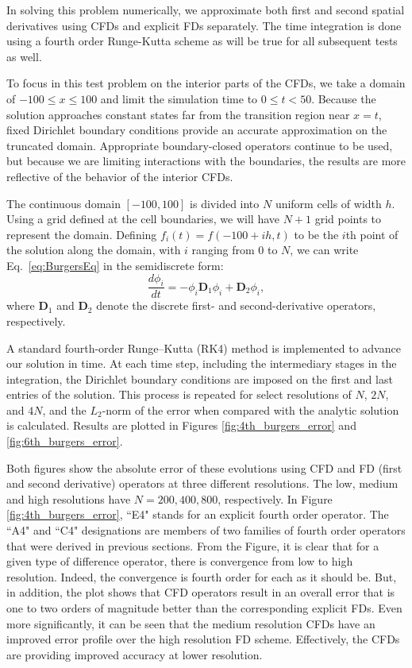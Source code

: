 In solving this problem numerically, we approximate both first and second spatial derivatives using CFDs and explicit FDs separately.  The time integration is done using a fourth order Runge-Kutta scheme as will be true for all subsequent tests as well.   

To focus in this test problem on the interior parts of the CFDs, we take a domain of $-100 \le x \le 100$ and limit the simulation time to $0 \le t < 50$. Because the solution approaches constant states far from the transition region near $x=t$, fixed Dirichlet boundary conditions provide an accurate approximation on the truncated domain.  Appropriate boundary-closed operators continue to be used, but because we are limiting interactions with the boundaries, the results are more reflective of the behavior of the interior CFDs.  

The continuous domain $[-100,100]$ is divided into $N$ uniform cells of width $h$. Using a grid defined at the cell boundaries, we will have $N+1$ grid points to represent the domain. Defining $f_i(t) = f(-100 + ih,t)$ to be the $i$th point of the solution along the domain, with $i$ ranging from $0$ to $N$, we can write Eq.~\ref{eq:BurgersEq} in the semidiscrete form:
\begin{equation}
    \frac{d \phi_i}{d t} = -\phi_i \textbf{D}_1 \phi_i + \textbf{D}_2\phi_i,
\end{equation}
where $\textbf{D}_1$ and $\textbf{D}_2$ denote the discrete first- and second-derivative operators, respectively.

A standard fourth-order Runge--Kutta (RK4) method is implemented to advance our solution in time. At each time step, including the intermediary stages in the integration, the Dirichlet boundary conditions are imposed on the first and last entries of the solution. This process is repeated for select resolutions of $N$, $2N$, and $4N$, and the $L_2$-norm of the error when compared with the analytic solution is calculated.
Results are plotted in Figures \ref{fig:4th_burgers_error} and \ref{fig:6th_burgers_error}.  

Both figures show the absolute error of these evolutions using CFD and FD (first and second derivative) operators at three different resolutions. The low, medium and high resolutions have $N=200,400,800$, respectively. In Figure \ref{fig:4th_burgers_error}, ``E4" stands for an explicit fourth order operator.  The ``A4" and ``C4" designations are members of two families of fourth order operators that were derived in previous sections.  From the Figure, it is clear that for a given type of difference operator, there is convergence from low to high resolution.  Indeed, the convergence is fourth order for each as it should be.  But, in addition, the plot shows that CFD operators result in an overall error that is one to two orders of magnitude better than the corresponding explicit FDs.  Even more significantly, it can be seen that the medium resolution CFDs have an improved error profile over the high resolution FD scheme.  Effectively, the CFDs are providing improved accuracy at lower resolution.  

